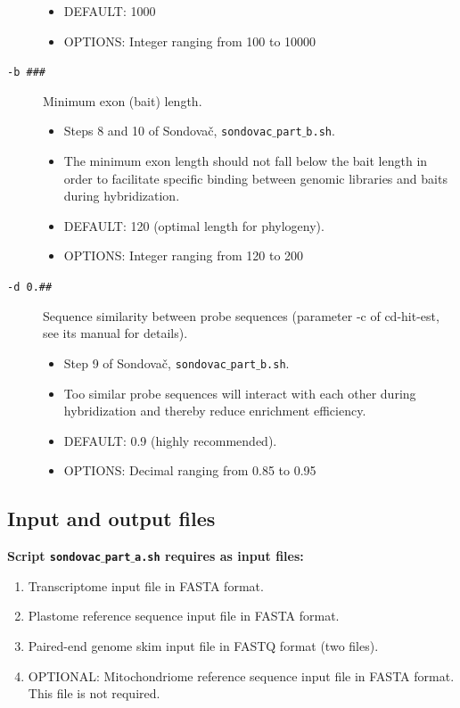 \documentclass[a4paper, 11pt, twoside]{article}
\begin{document}
\begin{description}
\begin{itemize}
    \item DEFAULT: 1000
    \item OPTIONS: Integer ranging from 100 to 10000
  \end{itemize}
\item[\texttt{-b \#\#\#}] Minimum exon (bait) length.
  \begin{itemize}
    \item Steps 8 and 10 of Sondovač, \texttt{sondovac$\_$part$\_$b.sh}.
    \item The minimum exon length should not fall below the bait length in order to facilitate specific binding between genomic libraries and baits during hybridization.
    \item DEFAULT: 120 (optimal length for phylogeny).
    \item OPTIONS: Integer ranging from 120 to 200
  \end{itemize}
\item[\texttt{-d 0.\#\#}] Sequence similarity between probe sequences (parameter -c of cd-hit-est, see its manual for details).
  \begin{itemize}
    \item Step 9 of Sondovač, \texttt{sondovac$\_$part$\_$b.sh}.
    \item Too similar probe sequences will interact with each other during hybridization and thereby reduce enrichment efficiency.
    \item DEFAULT: 0.9 (highly recommended).
    \item OPTIONS: Decimal ranging from 0.85 to 0.95
  \end{itemize}
\end{description}

\subsection{Input and output files}

\textbf{Script \texttt{sondovac$\_$part$\_$a.sh} requires as input files:}

\begin{enumerate}
  \item Transcriptome input file in FASTA format.
  \item Plastome reference sequence input file in FASTA format.
  \item Paired-end genome skim input file in FASTQ format (two files).
  \item OPTIONAL: Mitochondriome reference sequence input file in FASTA format. This file is not required.
\end{enumerate}
\end{document}

